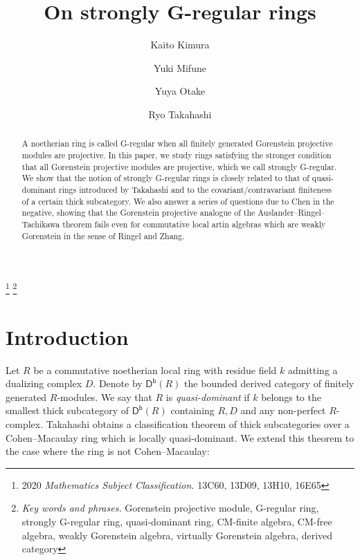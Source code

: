 \documentclass{amsart}
\theoremstyle{definition}
\theoremstyle{remark}
\numberwithin{equation}{thm}
\def\Db{\operatorname{\mathsf{D^b}}}
\begin{document}
\allowdisplaybreaks
\title{On strongly G-regular rings}
\author{Kaito Kimura}
\address{Department of Mathematics, Purdue University, 150 N. University Street, West Lafayette, IN 47907, USA}
\author{Yuki Mifune}
\address{Graduate School of Mathematics, Nagoya University, Furocho, Chikusaku, Nagoya 464-8602, Japan}
\author{Yuya Otake}
\address{Graduate School of Mathematical Sciences, The University of Tokyo, 3-8-1 Komaba, Meguro-ku, Tokyo 153-8914, Japan}
\author{Ryo Takahashi}
\address{Graduate School of Mathematics, Nagoya University, Furocho, Chikusaku, Nagoya 464-8602, Japan}
\thanks{2020 {\em Mathematics Subject Classification.} 13C60, 13D09, 13H10, 16E65}
\thanks{{\em Key words and phrases.} Gorenstein projective module, G-regular ring, strongly G-regular ring, quasi-dominant ring, CM-finite algebra, CM-free algebra, weakly Gorenstein algebra, virtually Gorenstein algebra, derived category}
\begin{abstract}
A noetherian ring is called G-regular when all finitely generated Gorenstein projective modules are projective. 
In this paper, we study rings satisfying the stronger condition that all Gorenstein projective modules are projective, which we call strongly G-regular. 
We show that the notion of strongly G-regular rings is closely related to that of quasi-dominant rings introduced by Takahashi and to the covariant/contravariant finiteness of a certain thick subcategory. 
We also answer a series of questions due to Chen in the negative, showing that the Gorenstein projective analogue of the Auslander--Ringel--Tachikawa theorem fails even for commutative local artin algebras which are weakly Gorenstein in the sense of Ringel and Zhang.
\end{abstract}
\maketitle
\section{Introduction}

Let $R$ be a commutative noetherian local ring with residue field $k$ admitting a dualizing complex $D$.
Denote by $\Db(R)$ the bounded derived category of finitely generated $R$-modules.
We say that $R$ is {\em quasi-dominant} if $k$ belongs to the smallest thick subcategory of $\Db(R)$ containing $R,D$ and any non-perfect $R$-complex.
Takahashi \cite{T23} obtains a classification theorem of thick subcategories over a Cohen--Macaulay ring which is locally quasi-dominant.
We extend this theorem to the case where the ring is not Cohen--Macaulay:
\end{document}
